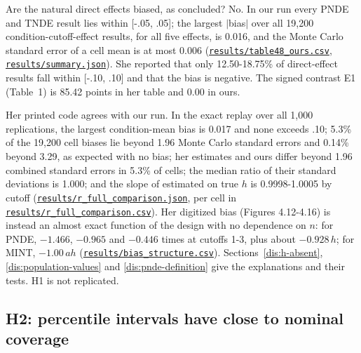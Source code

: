 Are the natural direct effects biased, as \citet[Table 4.8, printed p.~88; Chapter 5, p.~147]{chen2021} concluded? No. In our run every PNDE and TNDE result lies within [-.05, .05]; the largest $|$bias$|$ over all 19,200 condition-cutoff-effect results, for all five effects, is 0.016, and the Monte Carlo standard error of a cell mean is at most 0.006 (\href{https://github.com/alectionary/vibe-math/blob/master/formalization/chen-rdd-mediation/results/table48_ours.csv}{\nolinkurl{results/table48_ours.csv}}, \href{https://github.com/alectionary/vibe-math/blob/master/formalization/chen-rdd-mediation/results/summary.json}{\nolinkurl{results/summary.json}}). She reported that only 12.50-18.75\% of direct-effect results fall within [-.10, .10] and that the bias is negative. The signed contrast E1 (Table~1) is 85.42 points in her table and 0.00 in ours.

Her printed code agrees with our run. In the exact replay over all 1,000 replications, the largest condition-mean bias is 0.017 and none exceeds .10; 5.3\% of the 19,200 cell biases lie beyond 1.96 Monte Carlo standard errors and 0.14\% beyond 3.29, as expected with no bias; her estimates and ours differ beyond 1.96 combined standard errors in 5.3\% of cells; the median ratio of their standard deviations is 1.000; and the slope of estimated on true $h$ is 0.9998-1.0005 by cutoff (\href{https://github.com/alectionary/vibe-math/blob/master/formalization/chen-rdd-mediation/results/r_full_comparison.json}{\nolinkurl{results/r_full_comparison.json}}, per cell in \href{https://github.com/alectionary/vibe-math/blob/master/formalization/chen-rdd-mediation/results/r_full_comparison.csv}{\nolinkurl{results/r_full_comparison.csv}}). Her digitized bias (Figures 4.12-4.16) is instead an almost exact function of the design with no dependence on $n$: for PNDE, $-1.466$, $-0.965$ and $-0.446$ times \cp{} at cutoffs 1-3, plus about $-0.928\,h$; for MINT, $-1.00\,ah$ (\href{https://github.com/alectionary/vibe-math/blob/master/formalization/chen-rdd-mediation/results/bias_structure.csv}{\nolinkurl{results/bias_structure.csv}}). Sections~\ref{dis:h-absent}, \ref{dis:population-values} and \ref{dis:pnde-definition} give the explanations and their tests. H1 is not replicated.

\subsection{H2: percentile intervals have close to nominal coverage}\label{sec:h2}

